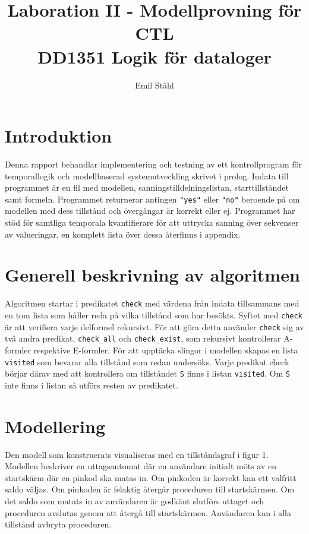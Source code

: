 \documentclass[]{article}
\title{Laboration II - Modellprovning för CTL \\ DD1351 Logik för dataloger }
\author{Emil Ståhl}
\begin{document}
\setlength\parindent{0pt}
\maketitle

\section{Introduktion}
Denna rapport behandlar implementering och testning av ett kontrollprogram för temporallogik och modellbaserad systemutveckling skrivet i prolog. Indata till programmet är en fil med modellen, sanningstilldelningslistan, starttillståndet samt formeln. Programmet returnerar antingen \texttt{"yes"} eller \texttt{"no"} beroende på om modellen med dess tillstånd och övergångar är korrekt eller ej. Programmet har stöd för samtliga temporala kvantifierare för att uttrycka sanning över sekvenser av valueringar, en komplett lista över dessa återfinns i appendix. 

\section{Generell beskrivning av algoritmen}
Algoritmen startar i predikatet \texttt{check} med värdena från indata tillsammans med en tom lista som håller reda på vilka tillstånd som har besökts. Syftet med \texttt{check} är att verifiera varje delformel rekursivt. För att göra detta använder \texttt{check} sig av två andra predikat, \texttt{check\_all} och \texttt{check\_exist}, som rekursivt kontrollerar A-formler respektive E-formler. För att upptäcka slingor i modellen skapas en lista  \texttt{visited} som bevarar alla tillstånd som redan undersöks. Varje predikat check börjar därav med att kontrollera om tillståndet  \texttt{S} finns i listan  \texttt{visited}. Om \texttt{S} inte finns i listan så utförs resten av predikatet.

\section{Modellering}
Den modell som konstruerats visualiseras med en tillståndsgraf i figur 1. Modellen beskriver en uttagsautomat där en användare initialt möts av en startskärm där en pinkod ska matas in. Om pinkoden är korrekt kan ett valfritt saldo väljas. Om pinkoden är felaktig återgår proceduren till startskärmen. Om det saldo som matats in av användaren är godkänt slutförs uttaget och proceduren avslutas genom att återgå till startskärmen. Användaren kan i alla tillstånd avbryta proceduren.
\end{document}
